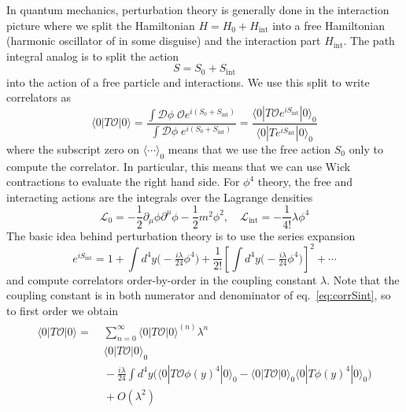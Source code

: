 \documentclass[12pt]{article}
\begin{document}
In quantum mechanics, perturbation theory is generally done in the
interaction picture where we split the Hamiltonian $H=H_0 +
H_\text{int}$ into a free Hamiltonian (harmonic oscillator of in some
disguise) and the interaction part $H_\text{int}$. The path integral
analog is to split the action
\begin{equation}
  S = S_0 + S_\text{int}
\end{equation}
into the action of a free particle and interactions. We use this split
to write correlators as
\begin{equation}
  \label{eq:corrSint}
  \langle 0 | T\mathcal{O} |0\rangle =
  \frac{
    \int \mathcal{D}\phi \; \mathcal{O} e^{i(S_0+S_\text{int})}
  }{ 
    \int \mathcal{D}\phi \; e^{i(S_0+S_\text{int})}
  }
  = 
  \frac{
    \langle0|T \mathcal{O} e^{iS_\text{int}} |0\rangle_0
  }{
    \langle0|T e^{iS_\text{int}} |0\rangle_0
  }
\end{equation}
where the subscript zero on $\langle \cdots \rangle_0$ means that we
use the free action $S_0$ only to compute the correlator. In
particular, this means that we can use Wick contractions to evaluate
the right hand side. For $\phi^4$ theory, the free and interacting
actions are the integrals over the Lagrange densities
\begin{equation}
  \mathcal{L}_0 = -\frac{1}{2} \partial_\mu \phi \partial^\mu \phi
  - \frac{1}{2} m^2 \phi^2
  , \quad
  \mathcal{L}_\text{int} = 
  - \frac{1}{4!} \lambda \phi^4
\end{equation}
The basic idea behind perturbation theory is to use the series
expansion
\begin{equation}
  e^{i S_\text{int}} = 
  1 + 
  \int d^4y \big(-\tfrac{i\lambda}{24} \phi^4 \big) + 
  \frac{1}{2!}
  \left[\int d^4y \big(-\tfrac{i\lambda}{24} \phi^4 \big)\right]^2
  + \cdots
\end{equation}
and compute correlators order-by-order in the coupling constant
$\lambda$. Note that the coupling constant is in both numerator and
denominator of eq.~\eqref{eq:corrSint}, so to first order we obtain
\begin{multline}
  \begin{split}
    \langle 0|T\mathcal{O}|0\rangle = &\;
    \sum_{n=0}^\infty \langle 0|T\mathcal{O}|0\rangle^{(n)} \lambda^n
    \\ &\;
    \langle 0|T\mathcal{O}|0\rangle_0 
    \\ &\;
    - \frac{i\lambda}{24} \int d^4y \Big(
    \langle 0|T\mathcal{O} \phi(y)^4 |0\rangle_0 - 
    \langle 0|T\mathcal{O} |0\rangle_0 
    \langle 0|T \phi(y)^4 |0\rangle_0 
    \Big)
    \\ &\;
    + O(\lambda^2)
  \end{split}
\end{multline}
\end{document}
